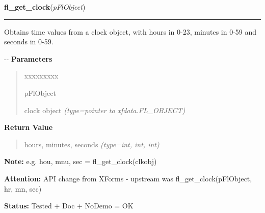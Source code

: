     \label{xformslib:flclock:fl_get_clock}

    \vspace{0.5ex}

\hspace{.8\funcindent}\begin{boxedminipage}{\funcwidth}

    \raggedright \textbf{fl\_get\_clock}(\textit{pFlObject})

    \vspace{-1.5ex}

    \rule{\textwidth}{0.5\fboxrule}
\setlength{\parskip}{2ex}

Obtains time values from a clock object, with hours in 0-23, minutes
in 0-59 and seconds in 0-59.

-{}-
\setlength{\parskip}{1ex}
      \textbf{Parameters}
      \vspace{-1ex}

      \begin{quote}
        \begin{Ventry}{xxxxxxxxx}

          \item[pFlObject]


clock object
            {\it (type=pointer to xfdata.FL\_OBJECT)}

        \end{Ventry}

      \end{quote}

      \textbf{Return Value}
    \vspace{-1ex}

      \begin{quote}

hours, minutes, seconds
      {\it (type=int, int, int)}

      \end{quote}

\textbf{Note:} 
e.g. hou, mnu, sec = fl\_get\_clock(clkobj)


\textbf{Attention:} 
API change from XForms - upstream was
fl\_get\_clock(pFlObject, hr, mn, sec)


\textbf{Status:} 
Tested + Doc + NoDemo = OK


    \end{boxedminipage}

    \label{xformslib:flclock:fl_set_clock_adjustment}

